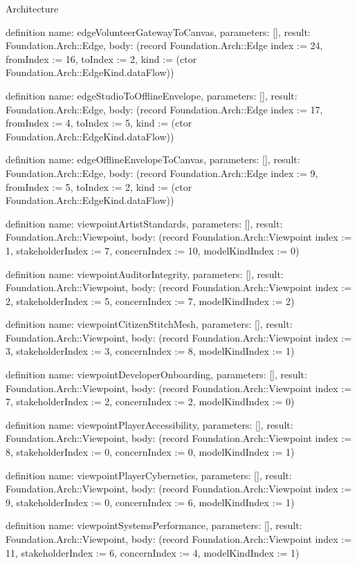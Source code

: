 \begin{lexlean}{Architecture}
\begin{semanticmodule}
definition{
  name: edgeVolunteerGatewayToCanvas,
  parameters: [],
  result: Foundation.Arch::Edge,
  body: (record Foundation.Arch::Edge {index := 24, fromIndex := 16, toIndex := 2, kind := (ctor Foundation.Arch::EdgeKind.dataFlow)})
}

definition{
  name: edgeStudioToOfflineEnvelope,
  parameters: [],
  result: Foundation.Arch::Edge,
  body: (record Foundation.Arch::Edge {index := 17, fromIndex := 4, toIndex := 5, kind := (ctor Foundation.Arch::EdgeKind.dataFlow)})
}

definition{
  name: edgeOfflineEnvelopeToCanvas,
  parameters: [],
  result: Foundation.Arch::Edge,
  body: (record Foundation.Arch::Edge {index := 9, fromIndex := 5, toIndex := 2, kind := (ctor Foundation.Arch::EdgeKind.dataFlow)})
}

definition{
  name: viewpointArtistStandards,
  parameters: [],
  result: Foundation.Arch::Viewpoint,
  body: (record Foundation.Arch::Viewpoint {index := 1, stakeholderIndex := 7, concernIndex := 10, modelKindIndex := 0})
}

definition{
  name: viewpointAuditorIntegrity,
  parameters: [],
  result: Foundation.Arch::Viewpoint,
  body: (record Foundation.Arch::Viewpoint {index := 2, stakeholderIndex := 5, concernIndex := 7, modelKindIndex := 2})
}

definition{
  name: viewpointCitizenStitchMesh,
  parameters: [],
  result: Foundation.Arch::Viewpoint,
  body: (record Foundation.Arch::Viewpoint {index := 3, stakeholderIndex := 3, concernIndex := 8, modelKindIndex := 1})
}

definition{
  name: viewpointDeveloperOnboarding,
  parameters: [],
  result: Foundation.Arch::Viewpoint,
  body: (record Foundation.Arch::Viewpoint {index := 7, stakeholderIndex := 2, concernIndex := 2, modelKindIndex := 0})
}

definition{
  name: viewpointPlayerAccessibility,
  parameters: [],
  result: Foundation.Arch::Viewpoint,
  body: (record Foundation.Arch::Viewpoint {index := 8, stakeholderIndex := 0, concernIndex := 0, modelKindIndex := 1})
}

definition{
  name: viewpointPlayerCybernetics,
  parameters: [],
  result: Foundation.Arch::Viewpoint,
  body: (record Foundation.Arch::Viewpoint {index := 9, stakeholderIndex := 0, concernIndex := 6, modelKindIndex := 1})
}

definition{
  name: viewpointSystemsPerformance,
  parameters: [],
  result: Foundation.Arch::Viewpoint,
  body: (record Foundation.Arch::Viewpoint {index := 11, stakeholderIndex := 6, concernIndex := 4, modelKindIndex := 1})
}


\end{semanticmodule}
\end{lexlean}
